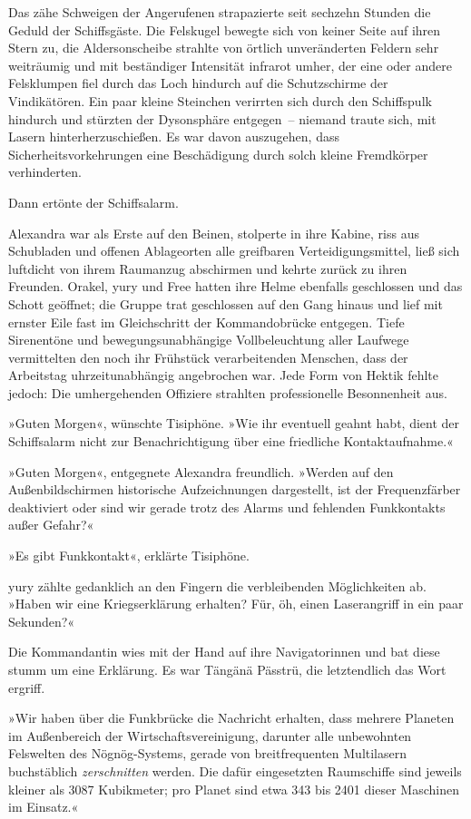 Das zähe Schweigen der Angerufenen strapazierte seit sechzehn Stunden die Geduld der Schiffsgäste. Die Felskugel bewegte sich von keiner Seite auf ihren Stern zu, die Aldersonscheibe strahlte von örtlich unveränderten Feldern sehr weiträumig und mit beständiger Intensität infrarot umher, der eine oder andere Felsklumpen fiel durch das Loch hindurch auf die Schutzschirme der Vindikätören. Ein paar kleine Steinchen verirrten sich durch den Schiffspulk hindurch und stürzten der Dysonsphäre entgegen~– niemand traute sich, mit Lasern hinterherzuschießen. Es war davon auszugehen, dass Sicherheitsvorkehrungen eine Beschädigung durch solch kleine Fremdkörper verhinderten.

Dann ertönte der Schiffsalarm.

Alexandra war als Erste auf den Beinen, stolperte in ihre Kabine, riss aus Schubladen und offenen Ablageorten alle greifbaren Verteidigungsmittel, ließ sich luftdicht von ihrem Raumanzug abschirmen und kehrte zurück zu ihren Freunden. Orakel, yury und Free hatten ihre Helme ebenfalls geschlossen und das Schott geöffnet; die Gruppe trat geschlossen auf den Gang hinaus und lief mit ernster Eile fast im Gleichschritt der Kommandobrücke entgegen. Tiefe Sirenentöne und bewegungsunabhängige Vollbeleuchtung aller Laufwege vermittelten den noch ihr Frühstück verarbeitenden Menschen, dass der Arbeitstag uhrzeitunabhängig angebrochen war. Jede Form von Hektik fehlte jedoch: Die umhergehenden Offiziere strahlten professionelle Besonnenheit aus.

»Guten Morgen«, wünschte Tisiphöne. »Wie ihr eventuell geahnt habt, dient der Schiffsalarm nicht zur Benachrichtigung über eine friedliche Kontaktaufnahme.«

»Guten Morgen«, entgegnete Alexandra freundlich. »Werden auf den Außenbildschirmen historische Aufzeichnungen dargestellt, ist der Frequenzfärber deaktiviert oder sind wir gerade trotz des Alarms und fehlenden Funkkontakts außer Gefahr?«

»Es gibt Funkkontakt«, erklärte Tisiphöne.

yury zählte gedanklich an den Fingern die verbleibenden Möglichkeiten ab. »Haben wir eine Kriegserklärung erhalten? Für, öh, einen Laserangriff in ein paar Sekunden?«

Die Kommandantin wies mit der Hand auf ihre Navigatorinnen und bat diese stumm um eine Erklärung. Es war Tängänä Pässtrü, die letztendlich das Wort ergriff.

»Wir haben über die Funkbrücke die Nachricht erhalten, dass mehrere Planeten im Außenbereich der Wirtschaftsvereinigung, darunter alle unbewohnten Felswelten des Nögnög-Systems, gerade von breitfrequenten Multilasern buchstäblich \emph{zerschnitten} werden. Die dafür eingesetzten Raumschiffe sind jeweils kleiner als 3087 Kubikmeter; pro Planet sind etwa 343 bis 2401 dieser Maschinen im Einsatz.«

